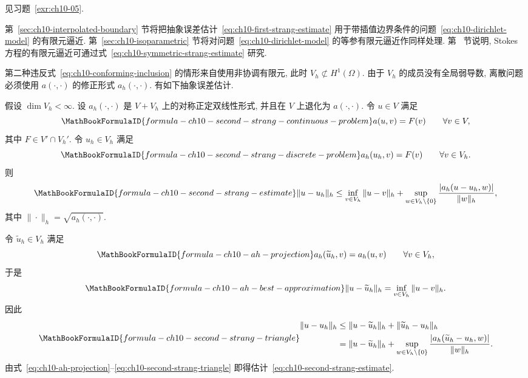\begin{Proof}
见习题~\ref{exr:ch10-05}.
\end{Proof}

第~\ref{sec:ch10-interpolated-boundary} 节将把抽象误差估计~\eqref{eq:ch10-first-strang-estimate} 用于带插值边界条件的问题~\eqref{eq:ch10-dirichlet-model} 的有限元逼近. 第~\ref{sec:ch10-isoparametric} 节将对问题~\eqref{eq:ch10-dirichlet-model} 的等参有限元逼近作同样处理. 第~ 节说明, Stokes 方程的有限元逼近可通过式~\eqref{eq:ch10-symmetric-strang-estimate} 研究.

第二种违反式~\eqref{eq:ch10-conforming-inclusion} 的情形来自使用非协调有限元, 此时 $V_h\not\subset H^1(\Omega)$. 由于 $V_h$ 的成员没有全局弱导数, 离散问题必须使用 $a(\cdot,\cdot)$ 的修正形式 $a_h(\cdot,\cdot)$. 有如下抽象误差估计.

\begin{Lemma}
\label{lem:ch10-second-strang}
假设 $\dim V_h<\infty$. 设 $a_h(\cdot,\cdot)$ 是 $V+V_h$ 上的对称正定双线性形式, 并且在 $V$ 上退化为 $a(\cdot,\cdot)$. 令 $u\in V$ 满足
\[
\MathBookFormulaID{formula-ch10-second-strang-continuous-problem}
a(u,v)=F(v)\qquad\forall v\in V,
\]
其中 $F\in V'\cap V_h'$. 令 $u_h\in V_h$ 满足
\[
\MathBookFormulaID{formula-ch10-second-strang-discrete-problem}
a_h(u_h,v)=F(v)\qquad\forall v\in V_h.
\]
则
\begin{equation}
\MathBookFormulaID{formula-ch10-second-strang-estimate}
\label{eq:ch10-second-strang-estimate}
\|u-u_h\|_h\leq\inf_{v\in V_h}\|u-v\|_h
+\sup_{w\in V_h\setminus\{0\}}\frac{|a_h(u-u_h,w)|}{\|w\|_h},
\end{equation}
其中 $\|\cdot\|_h=\sqrt{a_h(\cdot,\cdot)}$.
\end{Lemma}

\begin{Proof}
令 $\widetilde u_h\in V_h$ 满足
\begin{equation}
\MathBookFormulaID{formula-ch10-ah-projection}
\label{eq:ch10-ah-projection}
a_h(\widetilde u_h,v)=a_h(u,v)\qquad\forall v\in V_h,
\end{equation}
于是
\begin{equation}
\MathBookFormulaID{formula-ch10-ah-best-approximation}
\label{eq:ch10-ah-best-approximation}
\|u-\widetilde u_h\|_h=\inf_{v\in V_h}\|u-v\|_h.
\end{equation}
因此
\begin{equation}
\MathBookFormulaID{formula-ch10-second-strang-triangle}
\label{eq:ch10-second-strang-triangle}
\begin{split}
\|u-u_h\|_h
&\leq\|u-\widetilde u_h\|_h+\|\widetilde u_h-u_h\|_h\\
&=\|u-\widetilde u_h\|_h
+\sup_{w\in V_h\setminus\{0\}}\frac{|a_h(\widetilde u_h-u_h,w)|}{\|w\|_h}.
\end{split}
\end{equation}
由式~\eqref{eq:ch10-ah-projection}--\eqref{eq:ch10-second-strang-triangle} 即得估计~\eqref{eq:ch10-second-strang-estimate}.
\end{Proof}

